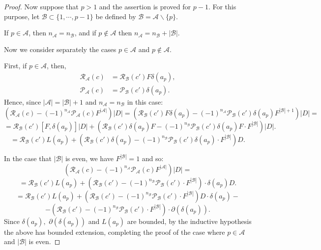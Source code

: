\begin{proof}
        Now suppose that $p > 1$ and the assertion is proved for $p-1$.
        For this purpose, let $\mathscr{B}\subset\{1,\cdots,p-1\}$ be defined by 
        $\mathscr{B}=\mathscr{A}\backslash\{p\}.$ 
        
        If $p \in \mathscr{A}$, then $n_{\mathscr{A}} = n_{\mathscr{B}}$, and if $p \notin \mathscr{A}$ then $n_{\mathscr{A}} = n_{\mathscr{B}} + |\mathscr{B}|$.
        
        
        Now we consider separately the cases $p \in \mathscr{A}$ and $p\notin \mathscr{A}$.
        
        First, if $p \in \mathscr{A}$, then,
        \begin{align*}
            \mathcal{R}_{\mathscr{A}}(c) &= \mathcal{R}_{\mathscr{B}}(c')F\delta(a_p),\\
            \mathcal{P}_{\mathscr{A}}(c) &= \mathcal{P}_{\mathscr{B}}(c')\delta(a_p).
        \end{align*}   
        Hence, since $|\mathscr{A}| = |\mathscr{B}|+1$ and $n_{\mathscr{A}} = n_{\mathscr{B}}$ in this case:
        $$(\mathcal{R}_{\mathscr{A}}(c) - (-1)^{n_{\mathscr{A}}}\mathcal{P}_{\mathscr{A}}(c)F^{|\mathscr{A}|})|D| =(\mathcal{R}_{\mathscr{B}}(c')F\delta(a_p)-(-1)^{n_{\mathscr{A}}}\mathcal{P}_{\mathscr{B}}(c')\delta(a_p)F^{|\mathscr{B}|+1})|D|=$$
        $$= \mathcal{R}_{\mathscr{B}}(c')[F,\delta(a_p)]|D|+(\mathcal{R}_{\mathscr{B}}(c')\delta(a_p)F-(-1)^{n_{\mathscr{B}}}\mathcal{P}_{\mathscr{B}}(c')\delta(a_p)F\cdot F^{|\mathscr{B}|})|D|.$$
        $$= \mathcal{R}_{\mathscr{B}}(c')L(a_p)+(\mathcal{R}_{\mathscr{B}}(c')\delta(a_p)-(-1)^{n_{\mathscr{B}}}\mathcal{P}_{\mathscr{B}}(c')\delta(a_p)\cdot F^{|\mathscr{B}|})D.$$

        In the case that $|\mathscr{B}|$ is even, we have $F^{|\mathscr{B}|} = 1$ and so:
        $$(\mathcal{R}_{\mathscr{A}}(c) - (-1)^{n_{\mathscr{A}}}\mathcal{P}_{\mathscr{A}}(c)F^{|\mathscr{A}|})|D|=$$
        $$=\mathcal{R}_{\mathscr{B}}(c')L(a_p)+(\mathcal{R}_{\mathscr{B}}(c')-(-1)^{n_{\mathscr{B}}}\mathcal{P}_{\mathscr{B}}(c')\cdot F^{|\mathscr{B}|})\cdot \delta(a_p)D.$$
        $$=\mathcal{R}_{\mathscr{B}}(c')L(a_p)+(\mathcal{R}_{\mathscr{B}}(c')-(-1)^{n_{\mathscr{B}}}\mathcal{P}_{\mathscr{B}}(c')\cdot F^{|\mathscr{B}|})D\cdot \delta(a_p)-$$
        $$-(\mathcal{R}_{\mathscr{B}}(c')-(-1)^{n_{\mathscr{B}}}\mathcal{P}_{\mathscr{B}}(c')\cdot F^{|\mathscr{B}|})\cdot\partial(\delta(a_p)).$$
        Since $\delta(a_p),$ $\partial(\delta(a_p))$ and $L(a_p)$ are bounded, by the inductive hypothesis the above has bounded extension, completing the proof of the case where $p \in \mathscr{A}$ and $|\mathscr{B}|$ is even.
        

\end{proof}
